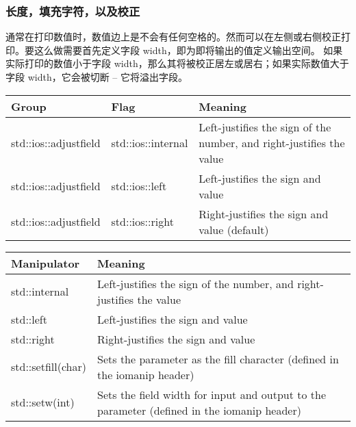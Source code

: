\documentclass[../../LearnCpp.tex]{subfiles}
\begin{document}
\subsubsection*{长度，填充字符，以及校正}

通常在打印数值时，数值边上是不会有任何空格的。然而可以在左侧或右侧校正打印。要这么做需要首先定义字段 width，即为即将输出的值定义输出空间。
如果实际打印的数值小于字段 width，那么其将被校正居左或居右；如果实际数值大于字段 width，它会被切断 -- 它将溢出字段。

\begin{center}
  \begin{tiny}
    \begin{tabularx}{ 1\textwidth}{
        | >{\raggedright\arraybackslash}X
        | >{\raggedright\arraybackslash}X
        | >{\raggedright\arraybackslash}X |
      }
      \hline
      Group                 & Flag               & Meaning                                                              \\
      \hline
      std::ios::adjustfield & std::ios::internal & Left-justifies the sign of the number, and right-justifies the value \\
      std::ios::adjustfield & std::ios::left     & Left-justifies the sign and value                                    \\
      std::ios::adjustfield & std::ios::right    & Right-justifies the sign and value (default)                         \\
      \hline
    \end{tabularx}
  \end{tiny}
\end{center}

\begin{center}
  \begin{tiny}
    \begin{tabularx}{ 1\textwidth}{
        | >{\raggedright\arraybackslash}X
        | >{\raggedright\arraybackslash}X |
      }
      \hline
      Manipulator        & Meaning                                                                                    \\
      \hline
      std::internal      & Left-justifies the sign of the number, and right-justifies the value                       \\
      std::left          & Left-justifies the sign and value                                                          \\
      std::right         & Right-justifies the sign and value                                                         \\
      std::setfill(char) & Sets the parameter as the fill character (defined in the iomanip header)                   \\
      std::setw(int)     & Sets the field width for input and output to the parameter (defined in the iomanip header) \\
      \hline
    \end{tabularx}
  \end{tiny}
\end{center}
\end{document}
